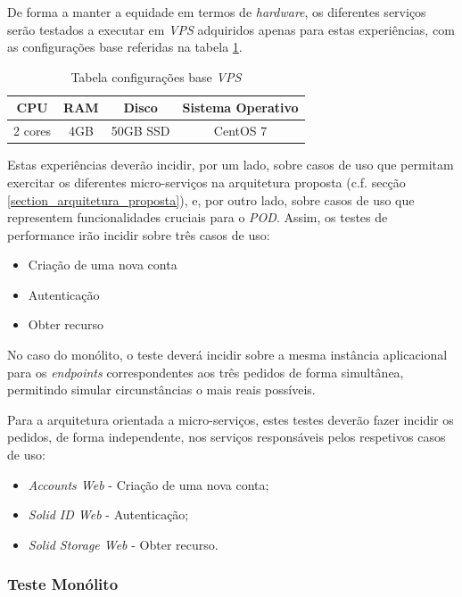 De forma a manter a equidade em termos de \emph{hardware}, os diferentes serviços serão testados a executar em \emph{\acrfull{VPS}} adquiridos apenas para estas experiências, com as configurações base referidas na tabela \ref{vps_configs}.

\begin{table}[h]
\centering
\caption{Tabela configurações base \emph{\acrshort{VPS}}}
\vspace{0.5cm}
\label{vps_configs}
\begin{tabular}{c|c|c|c|} 
CPU & RAM & Disco & Sistema Operativo \\
\hline                          
2 cores & 4GB & 50GB SSD & CentOS 7 \\
\end{tabular}
\end{table}

Estas experiências deverão incidir, por um lado, sobre casos de uso que permitam exercitar os diferentes micro-serviços na arquitetura proposta ({c.f.} secção \ref{section_arquitetura_proposta}), e, por outro lado, sobre casos de uso que representem funcionalidades cruciais para o \emph{\acrshort{POD}}. Assim, os testes de performance irão incidir sobre três casos de uso:
\begin{itemize}
    \item Criação de uma nova conta
    \item Autenticação
    \item Obter recurso
\end{itemize}

No caso do monólito, o teste deverá incidir sobre a mesma instância aplicacional para os \emph{endpoints} correspondentes aos três pedidos de forma simultânea, permitindo simular circunstâncias o mais reais possíveis.

Para a arquitetura orientada a micro-serviços, estes testes deverão fazer incidir os pedidos, de forma independente, nos serviços responsáveis pelos respetivos casos de uso:
\begin{itemize}
    \item \emph{Accounts Web} - Criação de uma nova conta;
    \item \emph{Solid ID Web} - Autenticação;
    \item \emph{Solid Storage Web} - Obter recurso.
\end{itemize}

\subsubsection*{Teste Monólito \label{section_tests_monolith}}

